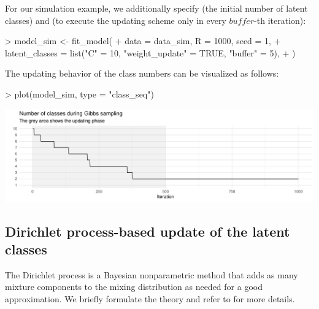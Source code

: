 \documentclass[article]{jss}
\begin{document}
For our simulation example, we additionally specify  (the initial number of latent classes) and  (to execute the updating scheme only in every $buffer$-th iteration):

\begin{Schunk}
\begin{Sinput}
> model_sim <- fit_model(
+    data = data_sim, R = 1000, seed = 1,
+    latent_classes = list("C" = 10, "weight_update" = TRUE, "buffer" = 5),
+  )
\end{Sinput}
\end{Schunk}

The updating behavior of the class numbers can be visualized as follows:

\begin{Schunk}
\begin{Sinput}
> plot(model_sim, type = "class_seq")
\end{Sinput}
\end{Schunk}
\includegraphics{rprobitb_oelschlaeger_bauer-model-sim-class-seq}

\subsection{Dirichlet process-based update of the latent classes} \label{subsec:dp_update}

The Dirichlet process is a Bayesian nonparametric method that adds as many mixture components to the mixing distribution as needed for a good approximation. We briefly formulate the theory and refer to \cite{Neal:2000} for more details.
\end{document}
